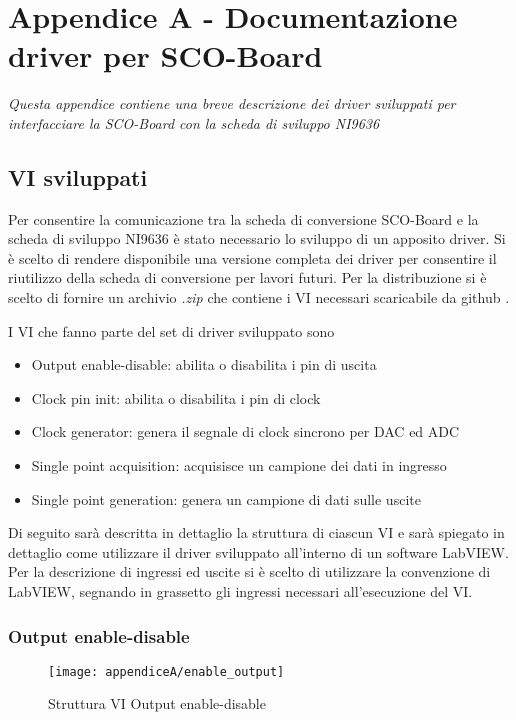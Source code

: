 \chapter{Appendice A - Documentazione driver per SCO-Board}
\label{appendiceA}
\thispagestyle{empty}

\textit{Questa appendice contiene una breve descrizione dei driver sviluppati per interfacciare la SCO-Board con la scheda di sviluppo NI9636}

\section{VI sviluppati}
Per consentire la comunicazione tra la scheda di conversione SCO-Board e la scheda di sviluppo NI9636 è stato necessario lo sviluppo di un apposito driver. Si è scelto di rendere disponibile una versione completa dei driver per consentire il riutilizzo della scheda di conversione per lavori futuri. 
Per la distribuzione si è scelto di fornire un archivio \textit{.zip} che contiene i VI necessari scaricabile da github \cite{sourceforge}.

I VI che fanno parte del set di driver sviluppato sono
\begin{itemize}
	\item Output enable-disable: abilita o disabilita i pin di uscita
	\item Clock pin init: abilita o disabilita i pin di clock
	\item Clock generator: genera il segnale di clock sincrono per DAC ed ADC
	\item Single point acquisition: acquisisce un campione dei dati in ingresso
	\item Single point generation: genera un campione di dati sulle uscite
\end{itemize}

Di seguito sarà descritta in dettaglio la struttura di ciascun VI e sarà spiegato in dettaglio come utilizzare il driver sviluppato all'interno di un software LabVIEW.
Per la descrizione di ingressi ed uscite si è scelto di utilizzare la convenzione di LabVIEW, segnando in grassetto gli ingressi necessari all'esecuzione del VI.

\subsection{Output enable-disable}

\begin{figure}[H]
	\begin{center}
		\texttt{[image: appendiceA/enable\_output]}
		\caption{Struttura VI Output enable-disable}
	\end{center}
\end{figure}

